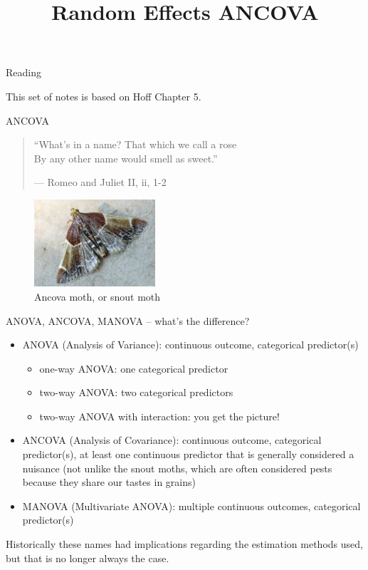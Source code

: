 \documentclass[ignorenonframetext,]{beamer}
\title{Random Effects ANCOVA}
\date{}
\providecommand{\tightlist}{%
  \setlength{\itemsep}{0pt}\setlength{\parskip}{0pt}}
\begin{document}
\frame{\titlepage}

\begin{frame}{Reading}

This set of notes is based on Hoff Chapter 5.

\end{frame}

\begin{frame}{ANCOVA}

\begin{quote}
``What's in a name? That which we call a rose\\
By any other name would smell as sweet.''

\hfill --- Romeo and Juliet II, ii, 1-2
\end{quote}

\begin{figure}
\centering
\includegraphics[width=0.40000\textwidth]{figures/ancovamoth.jpg}
\caption{Ancova moth, or snout moth}
\end{figure}

ANOVA, ANCOVA, MANOVA -- what's the difference?

\end{frame}

\begin{frame}{}

\begin{itemize}
\item
  ANOVA (Analysis of Variance): continuous outcome, categorical
  predictor(s)

  \begin{itemize}
  \tightlist
  \item
    one-way ANOVA: one categorical predictor
  \item
    two-way ANOVA: two categorical predictors
  \item
    two-way ANOVA with interaction: you get the picture!
  \end{itemize}
\item
  ANCOVA (Analysis of Covariance): continuous outcome, categorical
  predictor(s), at least one continuous predictor that is generally
  considered a nuisance (not unlike the snout moths, which are often
  considered pests because they share our tastes in grains)
\item
  MANOVA (Multivariate ANOVA): multiple continuous outcomes, categorical
  predictor(s)
\end{itemize}

Historically these names had implications regarding the estimation
methods used, but that is no longer always the case.

\end{frame}
\end{document}
